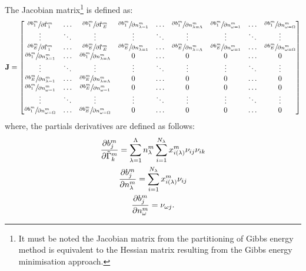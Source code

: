 The Jacobian matrix\footnote{It must be noted the Jacobian matrix from the partitioning of Gibbs energy method is equivalent to the Hessian matrix resulting from the Gibbs energy minimisation approach.} is defined as:
\begin{equation}
\mathbf{J} =
    \begin{bmatrix}
     \sfrac{\partial b_{1}^m}{\partial \tilde{\Gamma}_{1}^m} & \dots & \sfrac{\partial b_{1}^m}{\partial \tilde{\Gamma}_{E}^m} & \sfrac{\partial b_{1}^m}{\partial n_{\lambda=1}^m} & \dots & \sfrac{\partial b_{1}^m}{\partial n_{\lambda=\Lambda}^m} & \sfrac{\partial b_{1}^m}{\partial n_{\omega=1}^m} & \dots & \sfrac{\partial b_{1}^m}{\partial n_{\omega=\Omega}^m} \\
    \vdots & \ddots & \vdots & \vdots & \ddots & \vdots & \vdots & \ddots & \vdots \\
    \sfrac{\partial b_{E}^m}{\partial \tilde{\Gamma}_{1}^m} & \dots & \sfrac{\partial b_{E}^m}{\partial \tilde{\Gamma}_{E}^m} & \sfrac{\partial b_{E}^m}{\partial n_{\lambda=1}^m} & \dots & \sfrac{\partial b_{E}^m}{\partial n_{\lambda=\Lambda}^m} & \sfrac{\partial b_{E}^m}{\partial n_{\omega=1}^m} & \dots & \sfrac{\partial b_{E}^m}{\partial n_{\omega=\Omega}^m} \\
    \sfrac{\partial b_{1}^m}{\partial n_{\lambda=1}^m} & \dots & \sfrac{\partial b_{1}^m}{\partial n_{\lambda=\Lambda}^m} & 0 & \dots & 0 & 0 & \dots & 0 \\
    \vdots & \ddots & \vdots & \vdots & \ddots & \vdots & \vdots & \ddots & \vdots \\
    \sfrac{\partial b_{E}^m}{\partial n_{\lambda=1}^m} & \dots & \sfrac{\partial b_{E}^m}{\partial n_{\lambda=\Lambda}^m} & 0 & \dots & 0 & 0 & \dots & 0 \\
    \sfrac{\partial b_{1}^m}{\partial n_{\omega=1}^m} & \dots & \sfrac{\partial b_{E}^m}{\partial n_{\omega=1}^m} & 0 & \dots & 0 & 0 & \dots & 0 \\
    \vdots & \ddots & \vdots & \vdots & \ddots & \vdots & \vdots & \ddots & \vdots \\
    \sfrac{\partial b_{1}^m}{\partial n_{\omega=\Omega}^m} & \dots & \sfrac{\partial b_{E}^m}{\partial n_{\omega=\Omega}^m} & 0 & \dots & 0 & 0 & \dots & 0
    \end{bmatrix}
\end{equation}
where, the partials derivatives are defined as follows:
\begin{gather}
    \frac{\partial b_{j}^m}{\partial \tilde{\Gamma}_{k}^m} = \sum_{\lambda=1}^{\Lambda} n_\lambda^m \sum_{i = 1}^{N_{\lambda}} x_{i(\lambda)}^m \nu_{ij} \nu_{ik}\\
    \frac{\partial b_{j}^m}{\partial n_{\lambda}^m} = \sum_{i = 1}^{N_{\lambda}} x_{i(\lambda)}^m \nu_{ij} \\
    \frac{\partial b_{j}^m}{\partial n_{\omega}^m} = \nu_{\omega j}.
\end{gather}


